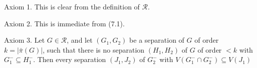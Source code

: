 Axiom 1. This is clear from the definition of $\mathscr{R}$.

Axiom 2. This is immediate from (7.1).

Axiom 3. Let $G \in \mathscr{R}$, and let $(G_1, G_2)$ be a separation of $G$ of order $k = |\bar{\pi}(G)|$, such that there is no separation $(H_1, H_2)$ of $G$ of order $< k$ with $G_1^- \subseteq H_1^-$. Then every separation $(J_1, J_2)$ of $G_2^-$ with $V(G_1^- \cap G_2^-) \subseteq V(J_1)$
